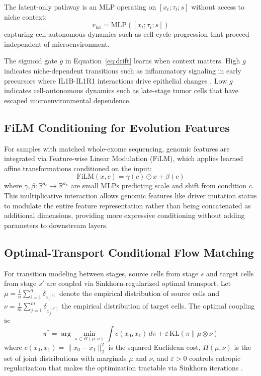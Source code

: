 \documentclass[conference]{IEEEtran}
\begin{document}
The latent-only pathway is an MLP operating on $[x_t; \tau_t; s]$ without access to niche context:
\begin{equation}
v_{\text{lat}} = \text{MLP}([x_t; \tau_t; s])
\label{eq:drift_lat}
\end{equation}
capturing cell-autonomous dynamics such as cell cycle progression that proceed independent of microenvironment.

The sigmoid gate $g$ in Equation~\ref{eq:drift} learns when context matters. High $g$ indicates niche-dependent transitions such as inflammatory signaling in early precursors where IL1B-IL1R1 interactions drive epithelial changes \cite{Peng2025-xu}. Low $g$ indicates cell-autonomous dynamics such as late-stage tumor cells that have escaped microenvironmental dependence.

\subsection{FiLM Conditioning for Evolution Features}

For samples with matched whole-exome sequencing, genomic features are integrated via Feature-wise Linear Modulation (FiLM), which applies learned affine transformations conditioned on the input:
\begin{equation}
\text{FiLM}(x, c) = \gamma(c) \odot x + \beta(c)
\label{eq:film}
\end{equation}
where $\gamma, \beta: \mathbb{R}^{d_c} \to \mathbb{R}^{d_x}$ are small MLPs predicting scale and shift from condition $c$. This multiplicative interaction allows genomic features like driver mutation status to modulate the entire feature representation rather than being concatenated as additional dimensions, providing more expressive conditioning without adding parameters to downstream layers.

\subsection{Optimal-Transport Conditional Flow Matching}

For transition modeling between stages, source cells from stage $s$ and target cells from stage $s'$ are coupled via Sinkhorn-regularized optimal transport. Let $\mu = \frac{1}{n}\sum_{i=1}^n \delta_{x_i^{(s)}}$ denote the empirical distribution of source cells and $\nu = \frac{1}{m}\sum_{j=1}^m \delta_{x_j^{(s')}}$ the empirical distribution of target cells. The optimal coupling is:
\begin{equation}
\pi^* = \arg\min_{\pi \in \Pi(\mu,\nu)} \int c(x_0, x_1) \, d\pi + \varepsilon \, \text{KL}(\pi \| \mu \otimes \nu)
\label{eq:ot}
\end{equation}
where $c(x_0, x_1) = \|x_0 - x_1\|_2^2$ is the squared Euclidean cost, $\Pi(\mu, \nu)$ is the set of joint distributions with marginals $\mu$ and $\nu$, and $\varepsilon > 0$ controls entropic regularization that makes the optimization tractable via Sinkhorn iterations \cite{Cuturi2013-li}.
\end{document}
